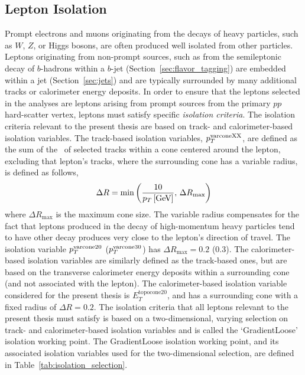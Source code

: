 %
%
\subsection{Lepton Isolation}
\label{sec:lepton_isolation}

Prompt electrons and muons originating from the decays of heavy particles, such as $W$, $Z$, or Higgs bosons,
are often produced well isolated from other particles.
Leptons originating from non-prompt sources, such as from the semileptonic decay of $b$-hadrons
within a $b$-jet (Section~\ref{sec:flavor_tagging}) are embedded within a jet (Section~\ref{sec:jets}) and are typically
surrounded by many additional tracks or calorimeter energy deposits.
In order to ensure that the leptons selected in the analyses are leptons arising from prompt sources
from the primary $pp$ hard-scatter vertex, leptons must satisfy specific \textit{isolation criteria}.
The isolation criteria relevant to the present thesis are based on track- and calorimeter-based isolation variables.
The track-based isolation variables, $p_{T}^{\text{varconeXX}}$, are defined as the sum of the \pT~of selected
tracks within a cone centered around the lepton, excluding that lepton's tracks, where the surrounding cone
has a variable radius, is defined as follows,%
\begin{align}
    \Delta R = \min \left( \frac{10}{p_{T}\,[\text{GeV}]},\,\Delta R_{\text{max}} \right)
    \label{eq:varcone_iso}
\end{align}
where $\Delta R_{\text{max}}$ is the maximum cone size.
The variable radius compensates for the fact that leptons produced in the decay of high-momentum heavy particles
tend to have other decay produces very close to the lepton's direction of travel.
The isolation variable $p_{T}^{\text{varcone20}}$ ($p_{T}^{\text{varcone30}}$) has $\Delta R_{\text{max}} = 0.2$ ($0.3$).
The calorimeter-based isolation variables are similarly defined as the track-based ones, but are
based on the transverse calorimeter energy deposits within a surrounding cone (and not associated with the lepton).
The calorimeter-based isolation variable considered for the present thesis is $E_T^{\text{topocone20}}$, and has
a surrounding cone with a fixed radius of $\Delta R = 0.2$.
The isolation criteria that all leptons relevant to the present thesis must satisfy is based
on a two-dimensional, varying selection on track- and calorimeter-based isolation variables
and is called the `GradientLoose' isolation working point.
The GradientLoose isolation working point, and its associated isolation variables used
for the two-dimensional selection, are defined in Table~\ref{tab:isolation_selection}.

